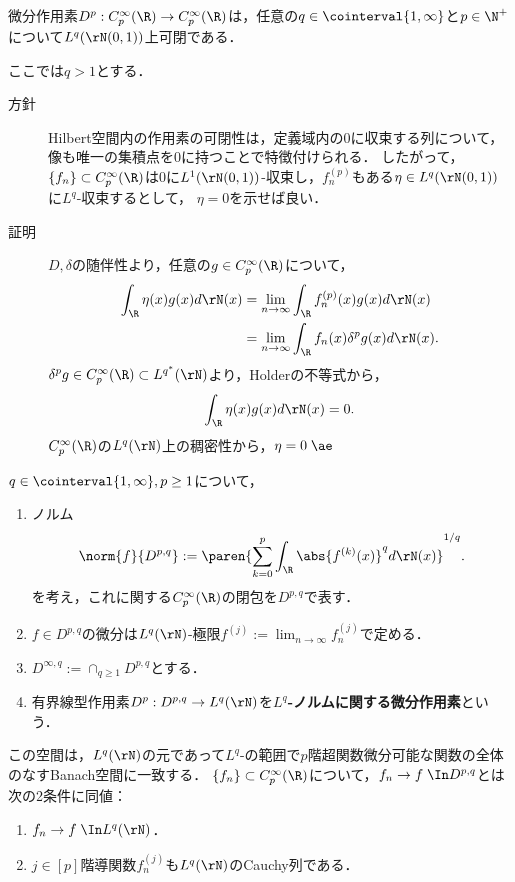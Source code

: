 \documentclass[uplatex,dvipdfmx]{jsreport}
\begin{document}
\begin{proposition}
    微分作用素$D^p:C_p^\infty(\R)\to C_p^\infty(\R)$は，任意の$q\in\cointerval{1,\infty}$と$p\in\N^+$について$L^q(\rN(0,1))$上可閉である．
\end{proposition}
\begin{Proof}
    ここでは$q>1$とする．
    \begin{description}
        \item[方針] Hilbert空間内の作用素の可閉性は，定義域内の$0$に収束する列について，像も唯一の集積点を$0$に持つことで特徴付けられる．
        したがって，
        $\{f_n\}\subset C_p^\infty(\R)$は$0$に$L^1(\rN(0,1))$-収束し，$f_n^{(p)}$もある$\eta\in L^q(\rN(0,1))$に$L^q$-収束するとして，
        $\eta=0$を示せば良い．
        \item[証明] $D,\delta$の随伴性より，任意の$g\in C^\infty_p(\R)$について，
        \begin{align*}
            \int_\R\eta(x)g(x)d\rN(x)&=\lim_{n\to\infty}\int_\R f_n^{(p)}(x)g(x)d\rN(x)\\
            &=\lim_{n\to\infty}\int_\R f_n(x)\delta^pg(x)d\rN(x).
        \end{align*}
        $\delta^pg\in C_p^\infty(\R)\subset L^{q^*}(\rN)$より，Holderの不等式から，
        \[\int_\R\eta(x)g(x)d\rN(x)=0.\]
        $C_p^\infty(\R)$の$L^q(\rN)$上の稠密性から，$\eta=0\;\ae$
    \end{description}
\end{Proof}

\begin{definition}
    $q\in\cointerval{1,\infty},p\ge1$について，
    \begin{enumerate}
        \item ノルム
        \[\norm{f}{D^{p,q}}:=\paren{\sum_{k=0}^p\int_\R\abs{f^{(k)}(x)}^qd\rN(x)}^{1/q}.\]
        を考え，これに関する$C_p^\infty(\R)$の閉包を$D^{p,q}$で表す．
        \item $f\in D^{p,q}$の微分は$L^q(\rN)$-極限$f^{(j)}:=\lim_{n\to\infty}f_n^{(j)}$で定める．
        \item $D^{\infty,q}:=\cap_{q\ge1}D^{p,q}$とする．
        \item 有界線型作用素$D^p:D^{p,q}\to L^q(\rN)$を\textbf{$L^q$-ノルムに関する微分作用素}という．
    \end{enumerate}
\end{definition}
\begin{remarks}
    この空間は，$L^q(\rN)$の元であって$L^q$-の範囲で$p$階超関数微分可能な関数の全体のなすBanach空間に一致する．
    $\{f_n\}\subset C_p^\infty(\R)$について，$f_n\to f\;\In D^{p,q}$とは次の2条件に同値：
    \begin{enumerate}
        \item $f_n\to f\;\In L^q(\rN)$．
        \item $j\in[p]$階導関数$f_n^{(j)}$も$L^q(\rN)$のCauchy列である．
    \end{enumerate}
\end{remarks}
\end{document}
